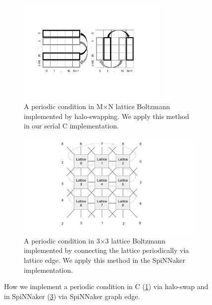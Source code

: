 \begin{figure}[!tb]

\begin{subfigure}[b]{1\textwidth}
       \centering
       \includegraphics[width=0.8\textwidth]{figures/haloswap.png}
       \caption{A periodic condition in M$\times$N lattice Boltzmann implemented by halo-swapping. We apply this method in our serial C implementation.}
       \label{fig:haloswap}
   \end{subfigure}
   \begin{subfigure}[b]{1\textwidth}
       \includegraphics[width=\textwidth]{figures/2dfabric.png}
       \caption{A periodic condition in 3$\times$3 lattice Boltzmann implemented by connecting the lattice periodically via lattice edge. We apply this method in the SpiNNaker implementation.}
       \label{fig:spinnaker_halo}
   \end{subfigure}
   \caption{How we implement a periodic condition in C (\ref{fig:haloswap}) via halo-swap and in SpiNNaker (\ref{fig:spinnaker_halo}) via SpiNNaker graph edge.}
\end{figure}

